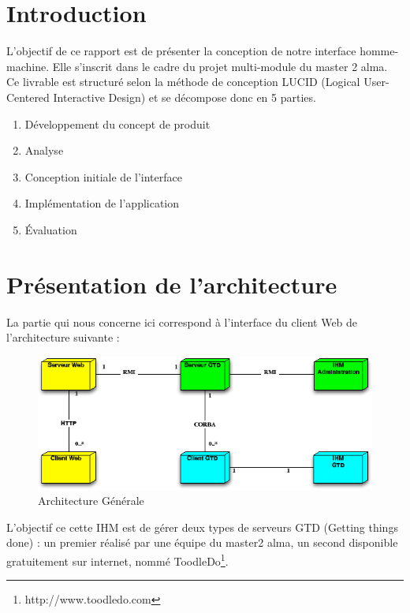 \chapter{Introduction}

L'objectif de ce rapport est de présenter la conception de notre interface homme-machine. Elle s'inscrit dans le cadre du projet multi-module du master 2 alma. Ce livrable est structuré selon la méthode de conception LUCID (Logical User-Centered Interactive Design) et se décompose donc en 5 parties.

\begin{enumerate}
 \item Développement du concept de produit
 \item Analyse
 \item Conception initiale de l’interface
 \item Implémentation de l’application
 \item Évaluation
\end{enumerate}



\chapter{Présentation de l'architecture}



La partie qui nous concerne ici correspond à l'interface du client Web de l'architecture suivante :

\begin{figure}[H]
\begin{center}
\includegraphics[scale=0.8]{diagrams/archi.png}
\caption{Architecture Générale}
\end{center}
\end{figure}


L'objectif ce cette IHM est de gérer deux types de serveurs GTD (Getting things done) : un premier réalisé par une équipe du master2 alma, un second disponible gratuitement sur internet, nommé ToodleDo\footnote{http://www.toodledo.com}.

